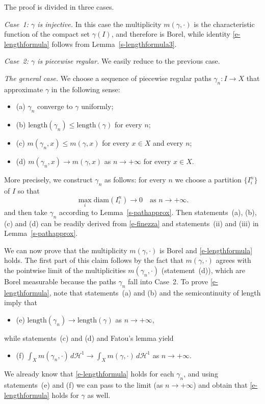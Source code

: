 \documentclass[11pt,reqno,a4paper,final]{amsart}
\makeatletter
\numberwithin{equation}{section}
\theoremstyle{mytheorem}
\theoremstyle{myremark}
\theoremstyle{myparagraph}
\renewenvironment{proof}[1][\proofname]{\par 
  \pushQED{\qed}%
  \normalfont \topsep10\p@\@plus6\p@\relax 
  \trivlist 
  \item[\hskip\labelsep 
    \bfseries 
    #1\@addpunct{.}]\ignorespaces 
}{%
  \popQED\endtrivlist\@endpefalse 
}
\providecommand{\proofname}{Proof}
\newenvironment{itemizeb}
{\begin{itemize}\itemsep=2pt\leftskip -5 pt}
{\end{itemize}}
\newcommand{\Haus}{\mathscr{H}}
\newcommand{\Len}{\mathrm{length}}
\newcommand{\diam}{\mathrm{diam}}
\makeatother
\begin{document}
\begin{proof}[Proof of Proposition~\ref{s-lengthformula}]
The proof is divided in three cases.

\medskip
\emph{Case~1: $\gamma$ is injective.}
In this case the multiplicity $m(\gamma,\cdot)$ is 
the characteristic function of 
the compact set $\gamma(I)$, and therefore is Borel, 
while identity \eqref{e-lengthformula} follows from 
Lemma~\ref{s-lengthformula3}.

\medskip
\emph{Case~2: $\gamma$ is piecewise regular.}
We easily reduce to the previous case. 

\medskip
\emph{The general case.}
We choose a sequence of 
piecewise regular paths $\gamma_n:I\to X$ 
that approximate $\gamma$ in the following sense:
%
\begin{itemizeb}
\item[(a)]
$\gamma_n$ converge to $\gamma$ uniformly;
\item[(b)]
$\Len(\gamma_n) \le \Len(\gamma)$ for every $n$; 
\item[(c)] 
$m(\gamma_n,x) \le m(\gamma,x)$ for every $x\in X$
and every $n$;
\item[(d)] 
$m(\gamma_n,x) \to m(\gamma,x)$ as $n\to+\infty$
for every $x\in X$.
\end{itemizeb}
%
More precisely, we construct $\gamma_n$ as follows:
for every $n$ we choose a partition $\{I^n_i\}$ of $I$
so that 
%
\begin{equation}
\label{e-finezza}
\max_i \diam(I^n_i) \to 0
\quad\text{as $n\to+\infty$.}
\end{equation}
%
and then take $\gamma_n$ according to Lemma~\ref{s-pathapprox}.
Then statements~(a), (b), (c) and (d) can be readily derived 
from \eqref{e-finezza} and statements~(ii) and (iii) in 
Lemma~\ref{s-pathapprox}.

\smallskip
We can now prove that the multiplicity $m(\gamma,\cdot)$ 
is Borel and \eqref{e-lengthformula} holds.
The first part of this claim follows by the fact that
$m(\gamma,\cdot)$ agrees with the pointwise limit of the 
multiplicities $m(\gamma_n,\cdot)$ (statement~(d)), which are 
Borel measurable because the paths $\gamma_n$ fall into Case~2.
To prove \eqref{e-lengthformula}, note that 
statements~(a) and (b) and the semicontinuity of length 
imply that
%
\begin{itemizeb}
\item[(e)]
$\Len(\gamma_n) \to \Len(\gamma)$ as $n\to+\infty$, 
\end{itemizeb}
%
while statements~(c) and (d) and Fatou's lemma yield
%
\begin{itemizeb}
\item[(f)]
$\int_X m(\gamma_n,\cdot) \, d\Haus^1 \to \int_X m(\gamma,\cdot) \, d\Haus^1$
as $n\to+\infty$.
\end{itemizeb}
%
We already know that \eqref{e-lengthformula}
holds for each $\gamma_n$, 
and using statements~(e) and (f)
we can pass to the limit (as $n\to+\infty$) 
and obtain that \eqref{e-lengthformula} holds
for $\gamma$ as well.
\end{proof}
\end{document}
